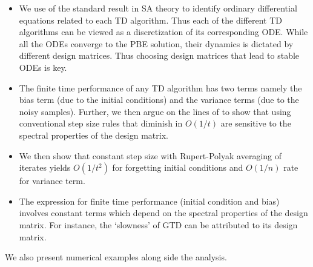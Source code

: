 \begin{itemize}[leftmargin=*] 
\item We use of the standard result in SA theory to identify ordinary differential equations related to each TD algorithm. Thus each of the different TD algorithms can be viewed as a discretization of its corresponding ODE. While all the ODEs converge to the PBE solution, their dynamics is dictated by different design matrices. Thus choosing design matrices that lead to stable ODEs is key.
\item The finite time performance of any TD algorithm has two terms namely the bias term (due to the initial conditions) and the variance terms (due to the noisy samples). Further, we then argue on the lines of \cite{} to show that using conventional step size rules that diminish in $O(1/t)$ are sensitive to the spectral properties of the design matrix.
\item We then show that constant step size with Rupert-Polyak averaging of iterates yields $O(1/t^2)$ for forgetting initial conditions and $O(1/n)$ rate for variance term.
\item The expression for finite time performance (initial condition and bias) involves constant terms which depend on the spectral properties of the design matrix. For instance, the `slowness’ of GTD can be attributed to its design matrix.
\end{itemize}
We also present numerical examples along side the analysis.

